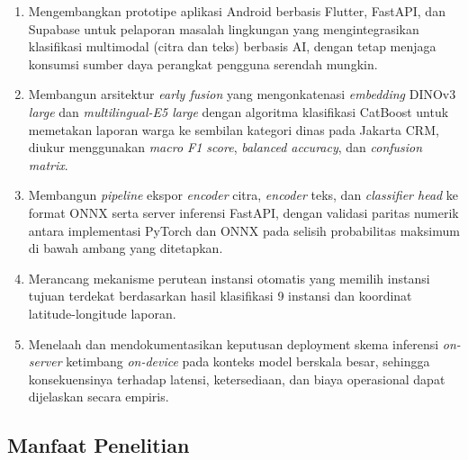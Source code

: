 \begin{enumerate}
    \item Mengembangkan prototipe aplikasi Android berbasis Flutter, FastAPI, dan Supabase untuk pelaporan masalah lingkungan yang mengintegrasikan klasifikasi multimodal (citra dan teks) berbasis AI, dengan tetap menjaga konsumsi sumber daya perangkat pengguna serendah mungkin.

    \item Membangun arsitektur \textit{early fusion} yang mengonkatenasi \textit{embedding} DINOv3 \textit{large} dan \textit{multilingual-E5 large} dengan algoritma klasifikasi CatBoost untuk memetakan laporan warga ke sembilan kategori dinas pada Jakarta CRM, diukur menggunakan \textit{macro F1 score}, \textit{balanced accuracy}, dan \textit{confusion matrix}.

    \item Membangun \textit{pipeline} ekspor \textit{encoder} citra, \textit{encoder} teks, dan \textit{classifier head} ke format ONNX serta server inferensi FastAPI, dengan validasi paritas numerik antara implementasi PyTorch dan ONNX pada selisih probabilitas maksimum di bawah ambang yang ditetapkan.

    \item Merancang mekanisme perutean instansi otomatis yang memilih instansi tujuan terdekat berdasarkan hasil klasifikasi 9 instansi dan koordinat latitude-longitude laporan.

    \item Menelaah dan mendokumentasikan keputusan deployment skema inferensi \textit{on-server} ketimbang \textit{on-device} pada konteks model berskala besar, sehingga konsekuensinya terhadap latensi, ketersediaan, dan biaya operasional dapat dijelaskan secara empiris.
\end{enumerate}

\subsection{Manfaat Penelitian}

